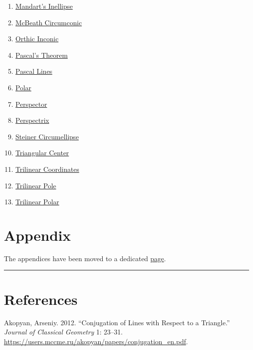 \documentclass[]{article}
\begin{document}
\begin{enumerate}
\item
  \href{http://mathworld.wolfram.com/MandartInellipse.html}{Mandart's Inellipse}
\item
  \href{http://mathworld.wolfram.com/MacBeathCircumconic.html}{McBeath Circumconic}
\item
  \href{http://mathworld.wolfram.com/OrthicInconic.html}{Orthic Inconic}
\item
  \href{http://mathworld.wolfram.com/PascalsTheorem.html}{Pascal's Theorem}
\item
  \href{http://mathworld.wolfram.com/PascalLines.html}{Pascal Lines}
\item
  \href{http://mathworld.wolfram.com/Polar.html}{Polar}
\item
  \href{http://mathworld.wolfram.com/Perspector.html}{Perspector}
\item
  \href{http://mathworld.wolfram.com/Perspectrix.html}{Perspectrix}
\item
  \href{http://mathworld.wolfram.com/ExtouchTriangle.html}{Steiner Circumellipse}
\item
  \href{http://mathworld.wolfram.com/TriangleCenter.html}{Triangular Center}
\item
  \href{http://mathworld.wolfram.com/TrilinearCoordinates.html}{Trilinear Coordinates}
\item
  \href{http://mathworld.wolfram.com/TrilinearPole.html}{Trilinear Pole}
\item
  \href{http://mathworld.wolfram.com/TrilinearPolar.html}{Trilinear Polar}
\end{enumerate}

\hypertarget{appendix}{%
\section{Appendix}\label{appendix}}

The appendices have been moved to a dedicated \href{appendices.html}{page}.

\begin{center}\rule{0.5\linewidth}{\linethickness}\end{center}

\hypertarget{references}{%
\section*{References}\label{references}}

\hypertarget{refs}{}
\leavevmode\hypertarget{ref-akopyan12}{}%
Akopyan, Arseniy. 2012. ``Conjugation of Lines with Respect to a Triangle.'' \emph{Journal of Classical Geometry} 1: 23--31. \url{https://users.mccme.ru/akopyan/papers/conjugation_en.pdf}.
\end{document}
